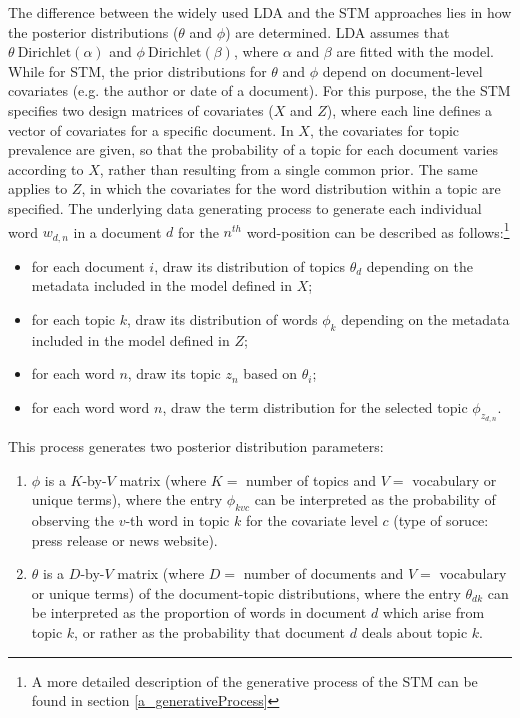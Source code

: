 \documentclass[12pt,a4paper,notitlepage]{article}
\begin{document}
The difference between the widely used LDA and the STM approaches lies in how the posterior distributions ($\theta$ and $\phi$) are determined. LDA assumes that $\theta ~ \text{Dirichlet}(\alpha)$ and $\phi ~ \text{Dirichlet}(\beta)$, where $\alpha$ and $\beta$ are fitted with the model. While for STM, the prior distributions for $\theta$ and $\phi$ depend on document-level covariates (e.g. the author or date of a document). For this purpose, the the STM specifies two design matrices of covariates ($X$ and $Z$), where each line defines a vector of covariates for a specific document. In $X$, the covariates for topic prevalence are given, so that the probability of a topic for each document varies according to $X$, rather than resulting from a single common prior. The same applies to $Z$, in which the covariates for the word distribution within a topic are specified. The underlying data generating process to generate each individual word $w_{d,n}$ in a document $d$ for the $n^{th}$ word-position can be described as follows:\footnote{A more detailed description of the generative process of the STM can be found in section \ref{a_generativeProcess}}

\begin{itemize}
	\item for each document $i$, draw its distribution of topics $\theta_d$ depending on the metadata included in the model defined in $X$; 
	\item for each topic $k$, draw its distribution of words $\phi_k$ depending on the metadata included in the model defined in $Z$;
	\item for each word $n$, draw its topic $z_n$ based on $\theta_i$;
	\item for each word word $n$, draw the term distribution for the selected topic $\phi_{z_{d,n}}$.
\end{itemize}

This process generates two posterior distribution parameters: 

\begin{enumerate}
	\item $\phi$ is a $K$-by-$V$ matrix (where $K=$ number of topics and $V=$ vocabulary or unique terms), where the entry $\phi_{kvc}$ can be interpreted as the probability of observing the $v$-th word in topic $k$ for the covariate level $c$ (type of soruce: press release or news website). 
	\item $\theta$ is a $D$-by-$V$ matrix (where $D=$ number of documents and $V=$ vocabulary or unique terms) of the document-topic distributions, where the entry $\theta_{dk}$ can be interpreted as the proportion of words in document $d$ which arise from topic $k$, or rather as the probability that document $d$ deals about topic $k$. 
\end{enumerate}
\end{document}
